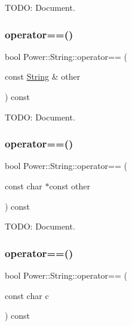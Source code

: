 T\+O\+DO\+: Document. 

\mbox{\label{class_power_1_1_string_ae4616e12ee74fcb4f86ffaa15560854b}} 
\subsubsection{\texorpdfstring{operator==()}{operator==()}\hspace{0.1cm}{\footnotesize\ttfamily [1/3]}}
{\footnotesize\ttfamily bool Power\+::\+String\+::operator== (\begin{DoxyParamCaption}\item[{const \hyperlink{class_power_1_1_string}{String} \&}]{other }\end{DoxyParamCaption}) const\hspace{0.3cm}{\ttfamily [inline]}}



T\+O\+DO\+: Document. 

\mbox{\label{class_power_1_1_string_ae357277377a5d612450fcf852ba5bee9}} 
\subsubsection{\texorpdfstring{operator==()}{operator==()}\hspace{0.1cm}{\footnotesize\ttfamily [2/3]}}
{\footnotesize\ttfamily bool Power\+::\+String\+::operator== (\begin{DoxyParamCaption}\item[{const char $\ast$const}]{other }\end{DoxyParamCaption}) const\hspace{0.3cm}{\ttfamily [inline]}}



T\+O\+DO\+: Document. 

\mbox{\label{class_power_1_1_string_a9a5cf72ccd272199f2eeb4baeaf7789f}} 
\subsubsection{\texorpdfstring{operator==()}{operator==()}\hspace{0.1cm}{\footnotesize\ttfamily [3/3]}}
{\footnotesize\ttfamily bool Power\+::\+String\+::operator== (\begin{DoxyParamCaption}\item[{const char}]{c }\end{DoxyParamCaption}) const\hspace{0.3cm}{\ttfamily [inline]}}



